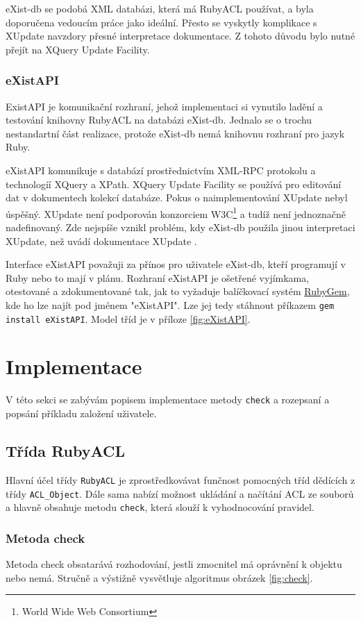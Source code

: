 eXist-db se podobá XML databázi, která má RubyACL používat, a byla doporučena vedoucím práce jako ideální. Přesto se vyskytly komplikace s XUpdate navzdory přesné interpretace dokumentace. Z tohoto důvodu bylo nutné přejít na XQuery Update Facility.

\subsubsection{eXistAPI}
ExistAPI je komunikační rozhraní, jehož implementaci si vynutilo ladění a testování knihovny RubyACL na databázi eXist-db. Jednalo se o trochu nestandartní část realizace, protože eXist-db nemá knihovnu rozhraní pro jazyk Ruby.

eXistAPI komunikuje s databází prostřednictvím XML-RPC protokolu a technologíí XQuery a XPath. XQuery Update Facility se používá pro editování dat v dokumentech kolekcí databáze.
Pokus o naimplementování XUpdate nebyl úspěšný. XUpdate není podporován konzorciem W3C\footnote{World Wide Web Consortium} a tudíž není jednoznačně nadefinovaný. Zde nejspíše vznikl problém, kdy eXist-db použila jinou interpretaci XUpdate, než uvádí dokumentace XUpdate \cite{xupdate}.

Interface eXistAPI považuji za přínos pro uživatele eXist-db, kteří programují v Ruby nebo to mají v plánu. Rozhraní eXistAPI je ošetřené vyjímkama, otestované a zdokumentované tak, jak to vyžaduje balíčkovací systém \href{https://rubygems.org/}{RubyGem}, kde ho lze najít pod jménem "eXistAPI". Lze jej tedy stáhnout příkazem \verb|gem install eXistAPI|. Model tříd je v příloze \ref{fig:eXistAPI}. 

\section{Implementace}
V této sekci se zabývám popisem implementace metody \verb|check| a rozepsaní a popsání příkladu založení uživatele.

\subsection{Třída RubyACL}

Hlavní účel třídy \verb|RubyACL| je zprostředkovávat funčnost pomocných tříd dědících z třídy \verb|ACL_Object|. Dále sama nabízí možnost ukládání a načítání ACL ze souborů a hlavně obsahuje metodu \verb|check|, která slouží k vyhodnocování pravidel.

\subsubsection{Metoda check}
Metoda check obsatarává rozhodování, jestli zmocnitel má oprávnění k objektu nebo nemá. Stručně a výstižně vysvětluje algoritmus obrázek \ref{fig:check}. 

